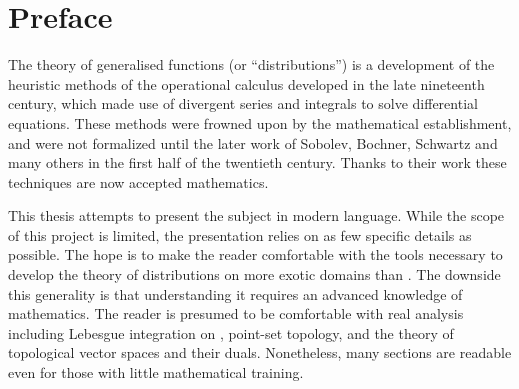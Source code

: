 \chapter*{Preface}
  The theory of generalised functions (or ``distributions'') is a development of the heuristic methods of the operational calculus developed in the late nineteenth century, which made use of divergent series and integrals to solve differential equations.
  These methods were frowned upon by the mathematical establishment, and were not formalized until the later work of Sobolev, Bochner, Schwartz and many others in the first half of the twentieth century.
  Thanks to their work these techniques are now accepted mathematics.

  This thesis attempts to present the subject in modern language.
  While the scope of this project is limited, the presentation relies on as few specific details as possible.
  The hope is to make the reader comfortable with the tools necessary to develop the theory of distributions on more exotic domains than \R.
  The downside this generality is that understanding it requires an advanced knowledge of mathematics.
  The reader is presumed to be comfortable with real analysis including Lebesgue integration on \R, point-set topology, and the theory of topological vector spaces and their duals.
  Nonetheless, many sections are readable even for those with little mathematical training.
